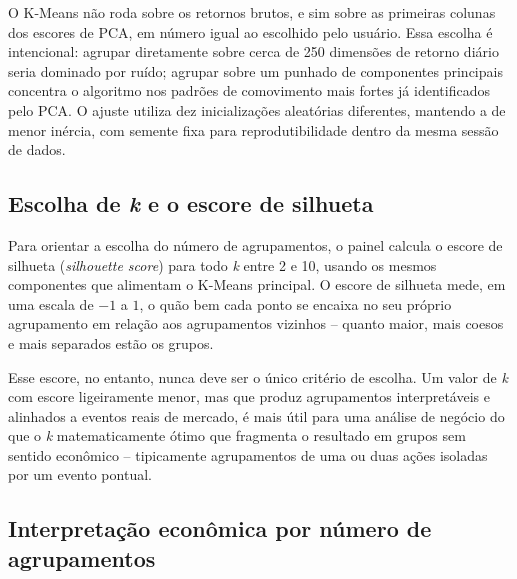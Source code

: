 \documentclass[12pt,oneside,a4paper,brazil,sumario=tradicional]{abntex2}
\begin{document}
O K-Means não roda sobre os retornos brutos, e sim sobre as primeiras colunas
dos escores de PCA, em número igual ao escolhido pelo usuário. Essa escolha é
intencional: agrupar diretamente sobre cerca de 250 dimensões de retorno diário
seria dominado por ruído; agrupar sobre um punhado de componentes principais
concentra o algoritmo nos padrões de comovimento mais fortes já identificados
pelo PCA. O ajuste utiliza dez inicializações aleatórias diferentes, mantendo a
de menor inércia, com semente fixa para reprodutibilidade dentro da mesma sessão
de dados.

\subsection{Escolha de \emph{k} e o escore de silhueta}

Para orientar a escolha do número de agrupamentos, o painel calcula o escore de
silhueta (\emph{silhouette score}) para todo \emph{k} entre 2 e 10, usando os
mesmos componentes que alimentam o K-Means principal. O escore de silhueta mede,
em uma escala de $-1$ a $1$, o quão bem cada ponto se encaixa no seu próprio
agrupamento em relação aos agrupamentos vizinhos -- quanto maior, mais coesos e
mais separados estão os grupos.

Esse escore, no entanto, nunca deve ser o único critério de escolha. Um valor de
\emph{k} com escore ligeiramente menor, mas que produz agrupamentos
interpretáveis e alinhados a eventos reais de mercado, é mais útil para uma
análise de negócio do que o \emph{k} matematicamente ótimo que fragmenta o
resultado em grupos sem sentido econômico -- tipicamente agrupamentos de uma ou
duas ações isoladas por um evento pontual.

\subsection{Interpretação econômica por número de agrupamentos}
\end{document}
